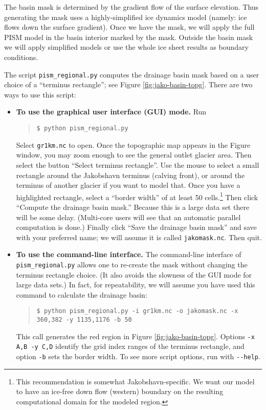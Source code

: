 The basin mask is determined by the gradient flow of the surface elevation.  Thus generating the mask uses a highly-simplified ice dynamics model (namely: ice flows down the surface gradient).  Once we have the mask, we will apply the full PISM model in the basin interior marked by the mask.  Outside the basin mask we will apply simplified models or use the whole ice sheet results as boundary conditions.

The script \texttt{pism_regional.py} computes the drainage basin mask based on a user choice of a ``terminus rectangle''; see Figure \ref{fig:jako-basin-topg}.  There are two ways to use this script:
\begin{itemize}
\item \textbf{To use the graphical user interface (GUI) mode.}  Run
\begin{quote}\small
\begin{verbatim}
$ python pism_regional.py
\end{verbatim}
\normalsize\end{quote}
Select \texttt{gr1km.nc} to open.  Once the topographic map appears in the Figure window, you may zoom enough to see the general outlet glacier area.  Then select the button ``Select terminus rectangle''.  Use the mouse to select a small rectangle around the Jakobshavn terminus (calving front), or around the terminus of another glacier if you want to model that.  Once you have a highlighted rectangle, select a ``border width'' of at least 50 cells.\footnote{This recommendation is somewhat Jakobshavn-specific. We want our model to have an ice-free down flow (western) boundary on the resulting computational domain for the modeled region.}  Then click ``Compute the drainage basin mask.''  Because this is a large data set there will be some delay. (Multi-core users will see that an automatic parallel computation is done.)  Finally click ``Save the drainage basin mask'' and save with your preferred name; we will assume it is called \texttt{jakomask.nc}.  Then quit.
\item \textbf{To use the command-line interface.}  The command-line interface of \texttt{pism_regional.py} allows one to re-create the mask without changing the terminus rectangle choice.  (It also avoids the slowness of the GUI mode for large data sets.)  In fact, for repeatability, we will assume you have used this command to calculate the drainage basin:
\begin{quote}\small
\begin{verbatim}
$ python pism_regional.py -i gr1km.nc -o jakomask.nc -x 360,382 -y 1135,1176 -b 50
\end{verbatim}
\normalsize\end{quote}
This call generates the red region in Figure \ref{fig:jako-basin-topg}.  Options \verb|-x A,B -y C,D| identify the grid index ranges of the terminus rectangle, and option \verb|-b| sets the border width.  To see more script options, run with \verb|--help|.
\end{itemize}

